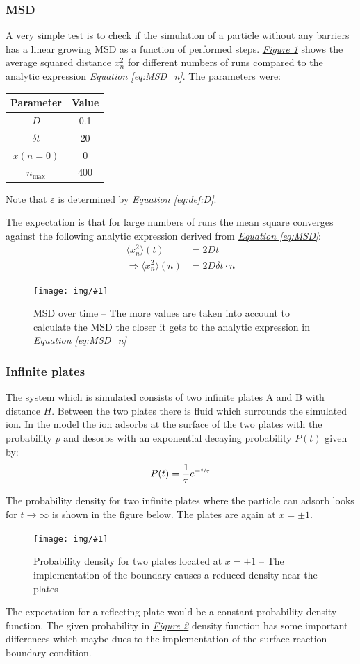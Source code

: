 \documentclass[a4paper, parskip=half]{scrartcl}
\newcommand{\myImage}[2]{
	\begin{figure}[H]
	\centering
	\texttt{[image: img/\#1]}
	\caption{#2}
	\label{pic:#1}
	\end{figure}
}
\newcommand{\myFigRef}[1]{\textit{\hyperref[#1]{Figure \ref*{#1}}}}
\newcommand{\myEqRef}[1]{\textit{\hyperref[eq:#1]{Equation \ref*{eq:#1}}}}
\newcommand{\myEqLabel}[1]{\label{eq:#1}}
\begin{document}
\subsubsection{MSD}
A very simple test is to check if the simulation of a particle without any barriers has a linear growing MSD as a function of performed steps. \myFigRef{pic:mean_square} shows the average squared distance $x_n^2$ for different numbers of runs compared to the analytic expression \myEqRef{MSD_n}. The parameters were:
\begin{center}
\begin{tabular}{c|c}
Parameter & Value \\\hline
$D$ & 0.1 \\
$\delta t$ & 20 \\
$x(n=0)$ & 0 \\
$n_{\mathrm{max}}$ & 400
\end{tabular}
\end{center}
Note that $\varepsilon$ is determined by \myEqRef{def:D}.

The expectation is that for large numbers of runs the mean square converges against the following analytic expression derived from \myEqRef{MSD}:
\begin{align}
\langle x_n^2\rangle (t) &= 2 D t \\
\Rightarrow\langle x_n^2\rangle (n) &= 2 D \delta t \cdot n \myEqLabel{MSD_n}
\end{align}
\myImage{mean_square}{MSD over time -- The more values are taken into account to calculate the MSD the closer it gets to the analytic expression in \myEqRef{MSD_n}}

\newpage
\subsubsection{Infinite plates}
The system which is simulated consists of two infinite plates A and B with distance $H$. Between the two plates there is fluid which surrounds the simulated ion. In the model the ion adsorbs at the surface of the two plates with the probability $p$ and desorbs with an exponential decaying probability $P(t)$ given by:
\begin{align}
P(t) = \frac{1}{\tau}e^{- \sfrac{t}{\tau}} \myEqLabel{adsorb_dist}
\end{align}

The probability density for two infinite plates where the particle can adsorb looks for $t\rightarrow \infty$ is shown in the figure below. The plates are again at $x = \pm 1$.
\myImage{probability_density}{Probability density for two plates located at $x = \pm 1$ -- The implementation of the boundary causes a reduced density near the plates}
The expectation for a reflecting plate would be a constant probability density function. The given probability in \myFigRef{pic:probability_density} density function has some important differences which maybe dues to the implementation of the surface reaction boundary condition. 
\end{document}
